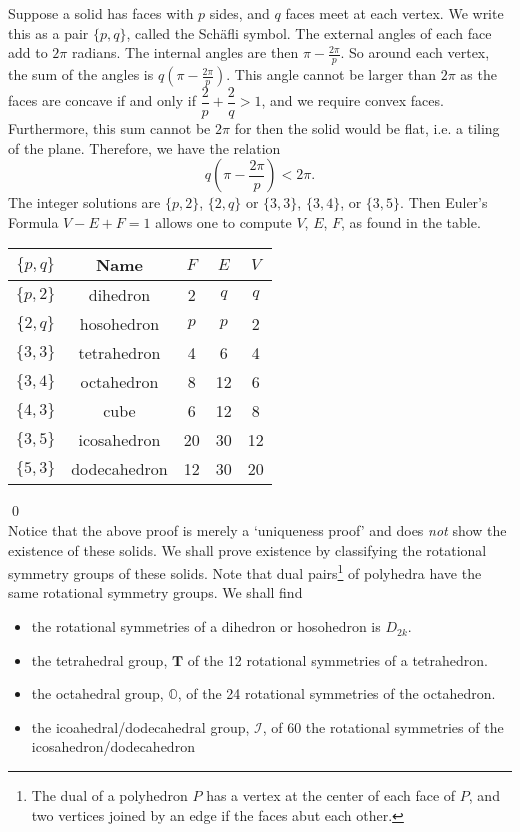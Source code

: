 \pf Suppose a solid has faces with $p$ sides, and $q$ faces meet at each vertex. We write this as a pair $\{p,q\}$, called the Sch\"afli symbol. The external angles of each face add to $2\pi$ radians. The internal angles are then $\pi - \frac{2\pi}{p}$. So around each vertex, the sum of the angles is $q(\pi - \frac{2\pi}{p})$. This angle cannot be larger than $2\pi$ as the faces are concave if and only if $\dfrac{2}{p} + \dfrac{2}{q}>1$, and we require convex faces. Furthermore, this sum cannot be $2\pi$ for then the solid would be flat, i.e. a tiling of the plane. Therefore, we have the relation
	\[
	q \left( \pi - \dfrac{2\pi}{p}\right)< 2\pi.
	\]
The integer solutions are $\{p,2\}$, $\{2,q\}$ or $\{3,3\}$, $\{3,4\}$, or $\{3,5\}$. Then Euler's Formula $V-E+F=1$ allows one to compute $V$, $E$, $F$, as found in the table.
	\begin{table}[h]
	\centering
	\begin{tabular}{ccccc}
	$\{p,q\}$ & Name & $F$ & $E$ & $V$ \\ \hline
	$\{p,2\}$ & dihedron & 2 & $q$ & $q$ \\
	$\{2,q\}$ & hosohedron & $p$ & $p$ & 2 \\
	$\{3,3\}$ & tetrahedron & 4 & 6 & 4 \\
	$\{3,4\}$ & octahedron & 8 & 12 & 6 \\
	$\{4,3\}$ & cube & 6 & 12 & 8 \\
	$\{3,5\}$ & icosahedron & 20 & 30 & 12 \\
	$\{5,3\}$ & dodecahedron & 12 & 30 & 20
	\end{tabular}
	\end{table}
\qed \\


Notice that the above proof is merely a `uniqueness proof' and does \emph{not} show the existence of these solids. We shall prove existence by classifying the rotational symmetry groups of these solids. Note that dual pairs\footnote{The dual of a polyhedron $P$ has a vertex at the center of each face of $P$, and two vertices joined by an edge if the faces abut each other.} of polyhedra have the same rotational symmetry groups. We shall find
	\begin{itemize}
	\item the rotational symmetries of a dihedron or hosohedron is $D_{2k}$.	
	\item the tetrahedral group, $\mathbf{T}$ of the 12 rotational symmetries of a tetrahedron. 
	\item the octahedral group, $\mathbb{O}$, of the 24 rotational symmetries of the octahedron.
	\item the icoahedral/dodecahedral group, $\mathcal{I}$, of 60 the rotational symmetries of the icosahedron/dodecahedron
	\end{itemize}

